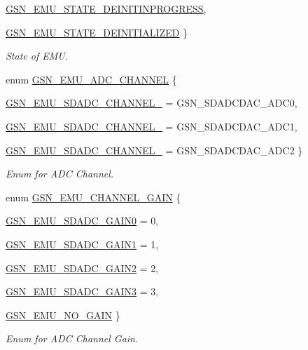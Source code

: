 \begin{DoxyCompactItemize}
\par
\hyperlink{a00663_ggaea130dfd5920349319a192bd421ec2bea3707c1856ea13bb4a71703fa4b726e93}{GSN\_\-EMU\_\-STATE\_\-DEINITINPROGRESS}, 
\par
\hyperlink{a00663_ggaea130dfd5920349319a192bd421ec2bea402d61ec6158565c9898b6399aaebc4c}{GSN\_\-EMU\_\-STATE\_\-DEINITIALIZED}
 \}
\begin{DoxyCompactList}\small\item\em State of EMU. \end{DoxyCompactList}\item 
enum \hyperlink{a00663_gaeae2554ac24a2af2730f23c80adf08bf}{GSN\_\-EMU\_\-ADC\_\-CHANNEL} \{ \par
\hyperlink{a00663_ggaeae2554ac24a2af2730f23c80adf08bfa9fd64b31d0448ee9e519767e53f8c7c6}{GSN\_\-EMU\_\-SDADC\_\-CHANNEL\_} =  GSN\_\-SDADCDAC\_\-ADC0, 
\par
\hyperlink{a00663_ggaeae2554ac24a2af2730f23c80adf08bfab71e0aa3ed4a09c31cf26e0685f626fd}{GSN\_\-EMU\_\-SDADC\_\-CHANNEL\_} =  GSN\_\-SDADCDAC\_\-ADC1, 
\par
\hyperlink{a00663_ggaeae2554ac24a2af2730f23c80adf08bfad5530cd41b67352aef45b5ed59820577}{GSN\_\-EMU\_\-SDADC\_\-CHANNEL\_} =  GSN\_\-SDADCDAC\_\-ADC2
 \}
\begin{DoxyCompactList}\small\item\em Enum for ADC Channel. \end{DoxyCompactList}\item 
enum \hyperlink{a00663_ga8a2c32cf9a6a1b827e675b91b42eab47}{GSN\_\-EMU\_\-CHANNEL\_\-GAIN} \{ \par
\hyperlink{a00663_gga8a2c32cf9a6a1b827e675b91b42eab47abbf78640af1f847081a98e70b88d3392}{GSN\_\-EMU\_\-SDADC\_\-GAIN0} =  0, 
\par
\hyperlink{a00663_gga8a2c32cf9a6a1b827e675b91b42eab47a0ee07e0c0756ba63ddb81868934b705b}{GSN\_\-EMU\_\-SDADC\_\-GAIN1} =  1, 
\par
\hyperlink{a00663_gga8a2c32cf9a6a1b827e675b91b42eab47a1995a0acd43847c762259526025cd7c4}{GSN\_\-EMU\_\-SDADC\_\-GAIN2} =  2, 
\par
\hyperlink{a00663_gga8a2c32cf9a6a1b827e675b91b42eab47accd39859c6206fe1fe3fb8cec834ae7c}{GSN\_\-EMU\_\-SDADC\_\-GAIN3} =  3, 
\par
\hyperlink{a00663_gga8a2c32cf9a6a1b827e675b91b42eab47a3c0e392688ec441fb391cf6e9c600a43}{GSN\_\-EMU\_\-NO\_\-GAIN}
 \}
\begin{DoxyCompactList}\small\item\em Enum for ADC Channel Gain. \end{DoxyCompactList}\end{DoxyCompactItemize}
